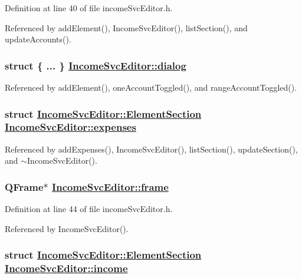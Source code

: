 Definition at line 40 of file income\-Svc\-Editor.h.

Referenced by add\-Element(), Income\-Svc\-Editor(), list\-Section(), and update\-Accounts().\hypertarget{classIncomeSvcEditor_r32}{
\subsubsection[dialog]{\setlength{\rightskip}{0pt plus 5cm}struct \{ ... \}   \hyperlink{classIncomeSvcEditor_r32}{Income\-Svc\-Editor::dialog}}}
\label{classIncomeSvcEditor_r32}




Referenced by add\-Element(), one\-Account\-Toggled(), and range\-Account\-Toggled().\hypertarget{classIncomeSvcEditor_r5}{
\subsubsection[expenses]{\setlength{\rightskip}{0pt plus 5cm}struct \hyperlink{structIncomeSvcEditor_1_1ElementSection}{Income\-Svc\-Editor::Element\-Section}  \hyperlink{classIncomeSvcEditor_r5}{Income\-Svc\-Editor::expenses}}}
\label{classIncomeSvcEditor_r5}




Referenced by add\-Expenses(), Income\-Svc\-Editor(), list\-Section(), update\-Section(), and $\sim$Income\-Svc\-Editor().\hypertarget{classIncomeSvcEditor_r2}{
\subsubsection[frame]{\setlength{\rightskip}{0pt plus 5cm}QFrame$\ast$ \hyperlink{classIncomeSvcEditor_r2}{Income\-Svc\-Editor::frame}}}
\label{classIncomeSvcEditor_r2}


Definition at line 44 of file income\-Svc\-Editor.h.

Referenced by Income\-Svc\-Editor().\hypertarget{classIncomeSvcEditor_r4}{
\subsubsection[income]{\setlength{\rightskip}{0pt plus 5cm}struct \hyperlink{structIncomeSvcEditor_1_1ElementSection}{Income\-Svc\-Editor::Element\-Section}  \hyperlink{classIncomeSvcEditor_r4}{Income\-Svc\-Editor::income}}}
\label{classIncomeSvcEditor_r4}




